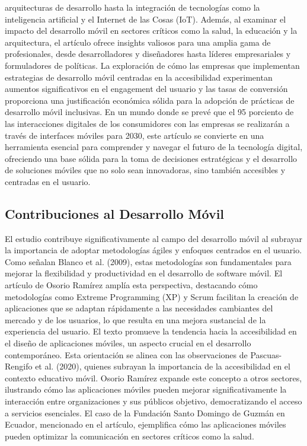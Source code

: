 \documentclass[12pt]{article}
\begin{document}
arquitecturas de desarrollo hasta la integración de tecnologías como la inteligencia artificial y el Internet de las Cosas (IoT). Además, al examinar el impacto del desarrollo móvil en sectores críticos como la salud, la educación y la arquitectura, el artículo ofrece insights valiosos para una amplia gama de profesionales, desde desarrolladores y diseñadores hasta líderes empresariales y formuladores de políticas. La exploración de cómo las empresas que implementan estrategias de desarrollo móvil centradas en la accesibilidad experimentan aumentos significativos en el engagement del usuario y las tasas de conversión proporciona una justificación económica sólida para la adopción de prácticas de desarrollo móvil inclusivas. En un mundo donde se prevé que el 95 porciento de las interacciones digitales de los consumidores con las empresas se realizarán a través de interfaces móviles para 2030, este artículo se convierte en una herramienta esencial para comprender y navegar el futuro de la tecnología digital, ofreciendo una base sólida para la toma de decisiones estratégicas y el desarrollo de soluciones móviles que no solo sean innovadoras, sino también accesibles y centradas en el usuario.

\subsection*{Contribuciones al Desarrollo Móvil}
El estudio contribuye significativamente al campo del desarrollo móvil al subrayar la importancia de adoptar metodologías ágiles y enfoques centrados en el usuario. Como señalan Blanco et al. (2009), estas metodologías son fundamentales para mejorar la flexibilidad y productividad en el desarrollo de software móvil. El artículo de Osorio Ramírez amplía esta perspectiva, destacando cómo metodologías como Extreme Programming (XP) y Scrum facilitan la creación de aplicaciones que se adaptan rápidamente a las necesidades cambiantes del mercado y de los usuarios, lo que resulta en una mejora sustancial de la experiencia del usuario.
El texto promueve la tendencia hacia la accesibilidad en el diseño de aplicaciones móviles, un aspecto crucial en el desarrollo contemporáneo. Esta orientación se alinea con las observaciones de Pascuas-Rengifo et al. (2020), quienes subrayan la importancia de la accesibilidad en el contexto educativo móvil. Osorio Ramírez expande este concepto a otros sectores, ilustrando cómo las aplicaciones móviles pueden mejorar significativamente la interacción entre organizaciones y sus públicos objetivo, democratizando el acceso a servicios esenciales. El caso de la Fundación Santo Domingo de Guzmán en Ecuador, mencionado en el artículo, ejemplifica cómo las aplicaciones móviles pueden optimizar la comunicación en sectores críticos como la salud.
 
\end{document}
